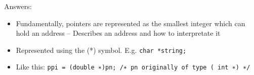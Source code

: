 Answers:

\begin{itemize}
\item  Fundamentally, pointers are represented as the smallest integer which can hold an address
– Describes an address and how to interpretate it
\item Represented using the (*) symbol. E.g. {\tt char *string; }
\item Like this: {\tt <++>ppi = (double ∗)pn; /∗ pn originally of type ( int ∗) ∗/ }
\end{itemize}



